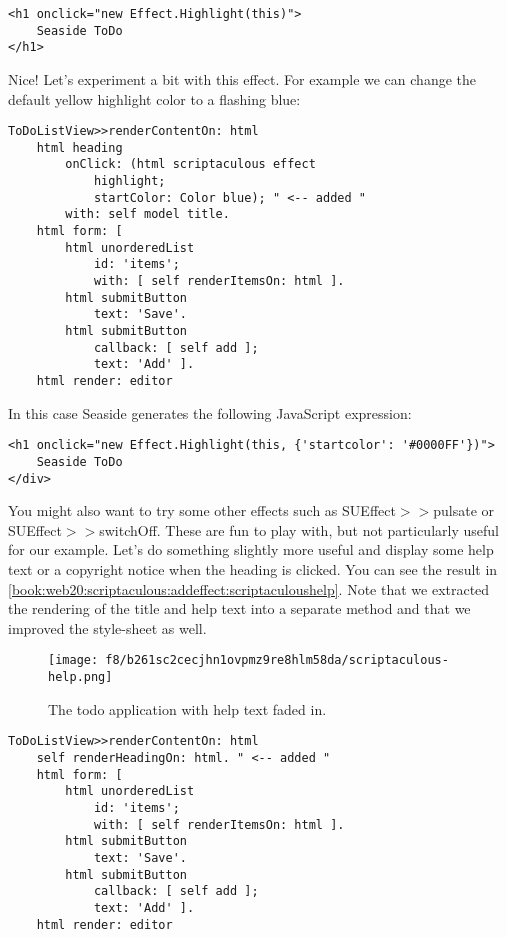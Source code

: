 \documentclass[a4paper,10pt,twoside]{book}
\newcommand{\ct}[1]{{\small\ttfamily\textup{#1}}}
\begin{document}
\begin{lstlisting}
<h1 onclick="new Effect.Highlight(this)">
    Seaside ToDo
</h1>
\end{lstlisting}

Nice! Let's experiment a bit with this effect. For example we can change the default yellow highlight color to a flashing blue:

\begin{lstlisting}
ToDoListView>>renderContentOn: html
    html heading
        onClick: (html scriptaculous effect
            highlight;
            startColor: Color blue); " <-- added "
        with: self model title.
    html form: [
        html unorderedList
            id: 'items';
            with: [ self renderItemsOn: html ].
        html submitButton
            text: 'Save'.
        html submitButton
            callback: [ self add ];
            text: 'Add' ].
    html render: editor
\end{lstlisting}

In this case Seaside generates the following JavaScript expression:

\begin{lstlisting}
<h1 onclick="new Effect.Highlight(this, {'startcolor': '#0000FF'})">
    Seaside ToDo
</div>
\end{lstlisting}

You might also want to try some other effects such as  \ct{SUEffect$>$$>$pulsate} or  \ct{SUEffect$>$$>$switchOff}. These are fun to play with, but not particularly useful for our example. Let's do something slightly more useful and display some help text or a copyright notice when the heading is clicked. You can see the result in \autoref{book:web20:scriptaculous:addeffect:scriptaculoushelp}. Note that we extracted the rendering of the title and help text into a separate method and that we improved the style-sheet as well.

\begin{figure}[h!tbp]
	\begin{center}
		\texttt{[image: f8/b261sc2cecjhn1ovpmz9re8hlm58da/scriptaculous-help.png]}
		\caption{The todo application with help text faded in.\label{book:web20:scriptaculous:addeffect:scriptaculoushelp}}
	\end{center}
\end{figure}


\begin{lstlisting}
ToDoListView>>renderContentOn: html
    self renderHeadingOn: html. " <-- added "
    html form: [
        html unorderedList
            id: 'items';
            with: [ self renderItemsOn: html ].
        html submitButton
            text: 'Save'.
        html submitButton
            callback: [ self add ];
            text: 'Add' ].
    html render: editor
\end{lstlisting}
\end{document}
